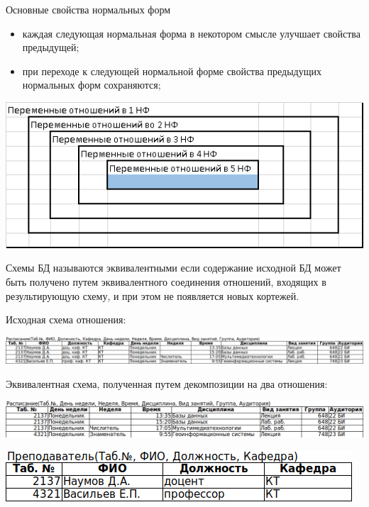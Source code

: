 \documentclass{beamer}
\begin{document}
\begin{frame}
\begin{block}{Основные свойства нормальных форм}
\begin{itemize}
\item каждая следующая нормальная форма в некотором смысле улучшает свойства предыдущей;
\item при переходе к следующей нормальной форме свойства предыдущих нормальных форм сохраняются;
\end{itemize}
\end{block}
\begin{center}
\includegraphics[scale=0.75]{images/forms.png}
\end{center}
\end{frame} 

\begin{frame}
\begin{block}{Схемы БД называются эквивалентными}
если содержание исходной БД может быть получено путем эквивалентного соединения отношений, входящих в результирующую схему, и при этом не появляется новых кортежей.
\end{block}
Исходная схема отношения:
\begin{center}
\includegraphics[scale=1.0]{images/ex-rasp-03.png}
\end{center}
Эквивалентная схема, полученная путем декомпозиции на два отношения:
\begin{center}
\includegraphics[scale=1.2]{images/ex-rasp-04.png}
\end{center}
\begin{center}
\includegraphics[scale=1.2]{images/ex-rasp-05.png}
\end{center}
\end{frame} 
\end{document}

